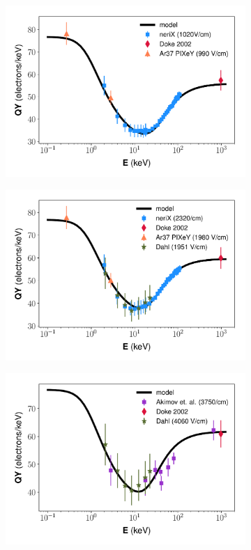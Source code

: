 \begin{figure}[!h]
\centering
\begin{subfigure}{0.5\linewidth}
\includegraphics[width=\linewidth]{Figures/Yields_fit_new/NEST_fit_1020Vcm_new.pdf}
\caption{}
\end{subfigure}%
\begin{subfigure}{0.5\linewidth}
\includegraphics[width=\linewidth]{Figures/Yields_fit_new/NEST_fit_2320Vcm_new.pdf}
\caption{}
\end{subfigure}
\centering
\begin{subfigure}{0.5\linewidth}
\includegraphics[width=\linewidth]{Figures/Yields_fit_new/NEST_fit_3750Vcm_new.pdf}

\end{subfigure}
\end{figure}
